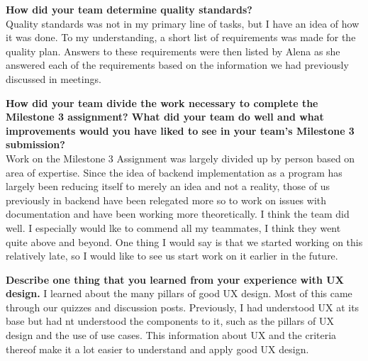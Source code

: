 \documentclass[10pt]{article}
\begin{document}
\textbf{How did your team determine quality standards?}\\
Quality standards was not in my primary line of tasks, but I have an idea of how it was done.
To my understanding, a short list of requirements was made for the quality plan.
Answers to these requirements were then listed by Alena as she answered each of the requirements based on the information we had previously discussed in meetings.

\pagebreak
\textbf{How did your team divide the work necessary to complete the Milestone 3 assignment?  What did your team do well and what improvements would you have liked to see in your team's Milestone 3 submission?}\\
Work on the Milestone 3 Assignment was largely divided up by person based on area of expertise. 
Since the idea of backend implementation as a program has largely been reducing itself to merely an idea and not a reality, those of us previously in backend have been relegated more so to work on issues with documentation and have been working more theoretically.
I think the team did well. 
I especially would lke to commend all my teammates, I think they went quite above and beyond.
One thing I would say is that we started working on this relatively late, so I would like to see us start work on it earlier in the future.

\textbf{Describe one thing that you learned from your experience with UX design.}
I learned about the many pillars of good UX design. 
Most of this came through our quizzes and discussion posts. 
Previously, I had understood UX at its base but had nt understood the components to it, such as the pillars of UX design and the use of use cases.
This information about UX and the criteria thereof make it a lot easier to understand and apply good UX design.
\end{document}
